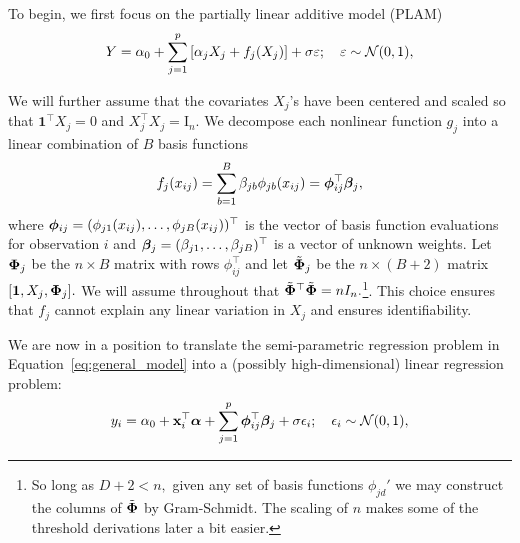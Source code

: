 
To begin, we first focus on the partially linear additive model (PLAM)
\begin{equation}
\label{eq:general_model}
Y = \alpha_{0} + \sum_{j = 1}^{p}{[\alpha_{j}X_{j} + f_{j}(X_{j})]} + \sigma \varepsilon; \quad \varepsilon \sim \mathcal{N}(0,1),
\end{equation}

We will further assume that the covariates $X_{j}$'s have been centered and scaled so that $\mathbf{1}^{\top}X_{j} = 0$ and $X_{j}^{\top}X_{j} = \text{I}_{n}.$
We decompose each nonlinear function $g_{j}$ into a linear combination of $B$ basis functions
$$
f_{j}(x_{ij}) = \sum_{b = 1}^{B}{\beta_{jb}\phi_{jb}(x_{ij})} = \boldsymbol{\phi}_{ij}^{\top}\boldsymbol{\beta}_{j},
$$
where $\boldsymbol{\phi}_{ij} = (\phi_{j1}(x_{ij}), \ldots, \phi_{jB}(x_{ij}))^{\top}$ is the vector of basis function evaluations for observation $i$ and $\boldsymbol{\beta}_{j} = (\beta_{j1}, \ldots, \beta_{jB})^{\top}$ is a vector of unknown weights.
Let $\boldsymbol{\Phi}_{j}$ be the $n \times B$ matrix with rows $\phi_{ij}^{\top}$ and let $\tilde{\boldsymbol{\Phi}}_{j}$ be the $n \times (B + 2)$ matrix $[\mathbf{1}, X_{j}, \boldsymbol{\Phi}_{j}].$
We will assume throughout that $\tilde{\boldsymbol{\Phi}}^{\top}\tilde{\boldsymbol{\Phi}} = nI_{n}.$\footnote{So long as $D + 2 < n,$ given any set of basis functions $\phi_{jd}'$ we may construct the columns of $\tilde{\boldsymbol{\Phi}}$ by Gram-Schmidt. The scaling of $n$ makes some of the threshold derivations later a bit easier.}.
This choice ensures that $f_{j}$ cannot explain any linear variation in $X_{j}$ and ensures identifiability.

We are now in a position to translate the semi-parametric regression problem in Equation~\eqref{eq:general_model} into a (possibly high-dimensional) linear regression problem:
\begin{equation}
\label{eq:general_model_linear_form}
y_{i} = \alpha_{0} + \mathbf{x}_{i}^{\top}\boldsymbol{\alpha} + \sum_{j = 1}^{p}{\boldsymbol{\phi}_{ij}^{\top}\boldsymbol{\beta}_{j}} + \sigma \epsilon_{i}; \quad \epsilon_{i} \sim \mathcal{N}(0,1),
\end{equation}


